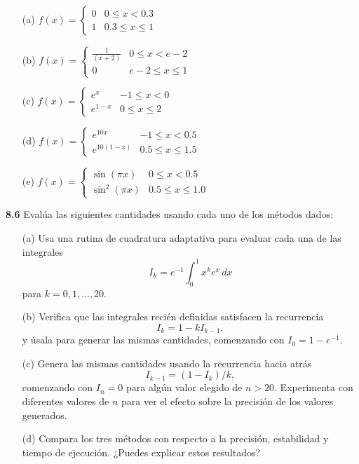 \documentclass{article}
\begin{document}
\begin{itemize}
    \item[(a)] \(f(x) = \begin{cases} 
    0 & 0 \leq x < 0.3 \\ 
    1 & 0.3 \leq x \leq 1 
    \end{cases}\)
    
    \item[(b)] \(f(x) = \begin{cases} 
    \frac{1}{(x + 2)} & 0 \leq x < e - 2 \\ 
    0 & e - 2 \leq x \leq 1 
    \end{cases}\)
    
    \item[(c)] \(f(x) = \begin{cases} 
    e^x & -1 \leq x < 0 \\ 
    e^{1-x} & 0 \leq x \leq 2 
    \end{cases}\)
    
    \item[(d)] \(f(x) = \begin{cases} 
    e^{10x} & -1 \leq x < 0.5 \\ 
    e^{10(1-x)} & 0.5 \leq x \leq 1.5 
    \end{cases}\)
    
    \item[(e)] \(f(x) = \begin{cases} 
    \sin(\pi x) & 0 \leq x < 0.5 \\ 
    \sin^2(\pi x) & 0.5 \leq x \leq 1.0 
    \end{cases}\)
\end{itemize}

\textbf{8.6} Evalúa las siguientes cantidades usando cada uno de los métodos dados:
\begin{itemize}
    \item[(a)] Usa una rutina de cuadratura adaptativa para evaluar cada una de las integrales
    \[
    I_k = e^{-1} \int_0^1 x^k e^x \, dx
    \]
    para \(k = 0, 1, \dots, 20\).
    
    \item[(b)] Verifica que las integrales recién definidas satisfacen la recurrencia
    \[
    I_k = 1 - k I_{k-1},
    \]
    y úsala para generar las mismas cantidades, comenzando con \(I_0 = 1 - e^{-1}\).
    
    \item[(c)] Genera las mismas cantidades usando la recurrencia hacia atrás
    \[
    I_{k-1} = (1 - I_k)/k,
    \]
    comenzando con \(I_n = 0\) para algún valor elegido de \(n > 20\). Experimenta con diferentes valores de \(n\) para ver el efecto sobre la precisión de los valores generados.
    
    \item[(d)] Compara los tres métodos con respecto a la precisión, estabilidad y tiempo de ejecución. ¿Puedes explicar estos resultados?
\end{itemize}
\end{document}

